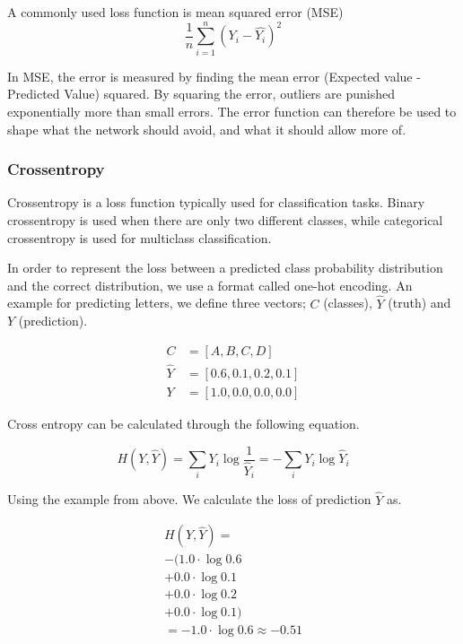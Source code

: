 A commonly used loss function is mean squared error (MSE)
\begin{equation}
    \frac{1}{n} \sum^n_{i=1} (Y_i - \hat{Y_i})^2
\end{equation}

In MSE, the error is measured by finding the mean error (Expected value - Predicted Value) squared. By squaring the error, outliers are punished exponentially more than small errors. The error function can therefore be used to shape what the network should avoid, and what it should allow more of.%

\subsubsection{Crossentropy}
\label{categorical-crossentropy}

Crossentropy is a loss function typically used for classification tasks. Binary crossentropy is used when there are only two different classes, while categorical crossentropy is used for multiclass classification.

In order to represent the loss between a predicted class probability distribution and the correct distribution, we use a format called one-hot encoding. An example for predicting letters, we define three vectors; $C$ (classes), $\hat{Y}$ (truth) and $Y$ (prediction).



\begin{equation} \label{eqn:catcross_ex1}
\begin{split}
    C &= [A, B, C, D] \\
    \hat{Y} &= [0.6, 0.1, 0.2, 0.1] \\
    Y &= [1.0, 0.0, 0.0, 0.0]
\end{split}
\end{equation}

Cross entropy can be calculated through the following equation.

\begin{equation} \label{eqn:catcross_ex2}
    H(Y, \hat{Y}) = \sum_i Y_i \log \frac{1}{\hat{Y}_i} = -\sum_i Y_i \log \hat{Y}_i
\end{equation}

Using the example from above. We calculate the loss of prediction $\hat{Y}$ as.

\begin{equation} \label{eqn:catcross_ex3}
\begin{split}
    H(Y, \hat{Y}) = \\
    -( 1.0 \cdot \log 0.6\\
    + 0.0 \cdot \log 0.1\\
    + 0.0 \cdot \log 0.2\\
    + 0.0 \cdot \log 0.1) \\
    = - 1.0 \cdot \log 0.6 \approx -0.51
\end{split}
\end{equation}


